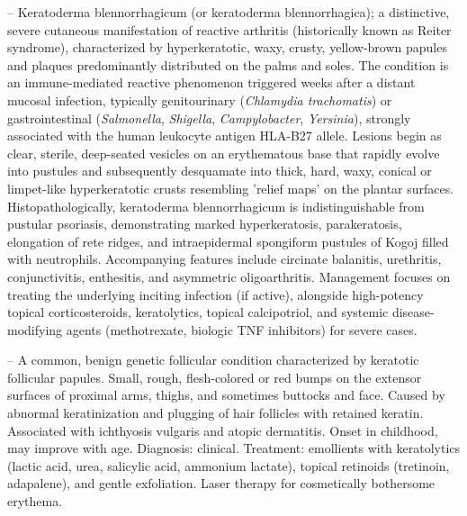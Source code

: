-- Keratoderma blennorrhagicum (or keratoderma blennorrhagica); a distinctive, severe cutaneous manifestation of reactive arthritis (historically known as Reiter syndrome), characterized by hyperkeratotic, waxy, crusty, yellow-brown papules and plaques predominantly distributed on the palms and soles. The condition is an immune-mediated reactive phenomenon triggered weeks after a distant mucosal infection, typically genitourinary (\textit{Chlamydia trachomatis}) or gastrointestinal (\textit{Salmonella}, \textit{Shigella}, \textit{Campylobacter}, \textit{Yersinia}), strongly associated with the human leukocyte antigen HLA-B27 allele. Lesions begin as clear, sterile, deep-seated vesicles on an erythematous base that rapidly evolve into pustules and subsequently desquamate into thick, hard, waxy, conical or limpet-like hyperkeratotic crusts resembling 'relief maps' on the plantar surfaces. Histopathologically, keratoderma blennorrhagicum is indistinguishable from pustular psoriasis, demonstrating marked hyperkeratosis, parakeratosis, elongation of rete ridges, and intraepidermal spongiform pustules of Kogoj filled with neutrophils. Accompanying features include circinate balanitis, urethritis, conjunctivitis, enthesitis, and asymmetric oligoarthritis. Management focuses on treating the underlying inciting infection (if active), alongside high-potency topical corticosteroids, keratolytics, topical calcipotriol, and systemic disease-modifying agents (methotrexate, biologic TNF inhibitors) for severe cases.

-- A common, benign genetic follicular condition characterized by keratotic follicular papules. Small, rough, flesh-colored or red bumps on the extensor surfaces of proximal arms, thighs, and sometimes buttocks and face. Caused by abnormal keratinization and plugging of hair follicles with retained keratin. Associated with ichthyosis vulgaris and atopic dermatitis. Onset in childhood, may improve with age. Diagnosis: clinical. Treatment: emollients with keratolytics (lactic acid, urea, salicylic acid, ammonium lactate), topical retinoids (tretinoin, adapalene), and gentle exfoliation. Laser therapy for cosmetically bothersome erythema.

